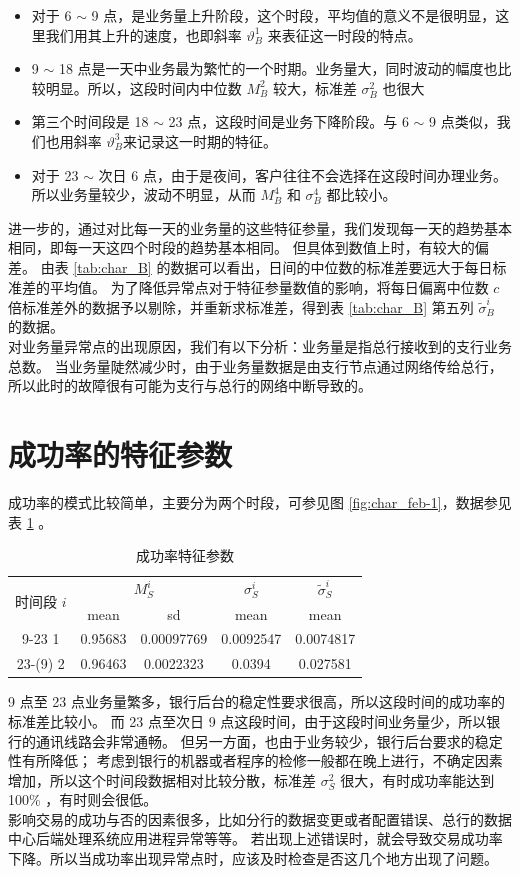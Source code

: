 \documentclass[a4paper]{article}
\begin{document}
\begin{itemize}
    \item 对于 6 $\sim$ 9 点，是业务量上升阶段，这个时段，平均值的意义不是很明显，这里我们用其上升的速度，也即斜率 $\vartheta_B^1$ 来表征这一时段的特点。
    \item 9 $\sim$ 18 点是一天中业务最为繁忙的一个时期。业务量大，同时波动的幅度也比较明显。所以，这段时间内中位数 $M_B^2$ 较大，标准差 $\sigma_B^2$ 也很大
    \item 第三个时间段是 18 $\sim$ 23 点，这段时间是业务下降阶段。与 6 $\sim$ 9 点类似，我们也用斜率 $\vartheta_B^3$来记录这一时期的特征。
    \item 对于 23 $\sim$ 次日 6 点，由于是夜间，客户往往不会选择在这段时间办理业务。所以业务量较少，波动不明显，从而 $M_B^4$ 和 $\sigma_B^4$ 都比较小。
\end{itemize}
进一步的，通过对比每一天的业务量的这些特征参量，我们发现每一天的趋势基本相同，即每一天这四个时段的趋势基本相同。
但具体到数值上时，有较大的偏差。
由表 \ref{tab:char_B} 的数据可以看出，日间的中位数的标准差要远大于每日标准差的平均值。
为了降低异常点对于特征参量数值的影响，将每日偏离中位数 $c$ 倍标准差外的数据予以剔除，并重新求标准差，得到表 \ref{tab:char_B} 第五列 $\tilde{\sigma}_B^i$ 的数据。
\\
\indent 对业务量异常点的出现原因，我们有以下分析：业务量是指总行接收到的支行业务总数。
当业务量陡然减少时，由于业务量数据是由支行节点通过网络传给总行，所以此时的故障很有可能为支行与总行的网络中断导致的。

\section{成功率的特征参数}
\indent 成功率的模式比较简单，主要分为两个时段，可参见图 \ref{fig:char_feb-1}，数据参见表 \ref{tab:char_S} 。
\begin{table}[H]
	\centering
	\caption{成功率特征参数}
	\label{tab:char_S}
	\begin{tabular}{c|cc|c|c}
		\hline
		\multirow{2}{*}{时间段 $i$} & \multicolumn{2}{c}{$M_S^i$} & $\sigma_S^i$ & $\tilde{\sigma}_S^i$ \\
		& mean        & sd            & mean        & mean                 \\
		\hline
		9-23 1                   & 0.95683     & 0.00097769    & 0.0092547   & 0.0074817            \\
		23-(9) 2                 & 0.96463     & 0.0022323     & 0.0394      & 0.027581            \\
		\hline
	\end{tabular}
\end{table}
9 点至 23 点业务量繁多，银行后台的稳定性要求很高，所以这段时间的成功率的标准差比较小。
而 23 点至次日 9 点这段时间，由于这段时间业务量少，所以银行的通讯线路会非常通畅。
但另一方面，也由于业务较少，银行后台要求的稳定性有所降低；
考虑到银行的机器或者程序的检修一般都在晚上进行，不确定因素增加，所以这个时间段数据相对比较分散，标准差 $\sigma_S^2$ 很大，有时成功率能达到 100\% ，有时则会很低。
\\
\indent 影响交易的成功与否的因素很多，比如分行的数据变更或者配置错误、总行的数据中心后端处理系统应用进程异常等等。
若出现上述错误时，就会导致交易成功率下降。所以当成功率出现异常点时，应该及时检查是否这几个地方出现了问题。
\end{document}
